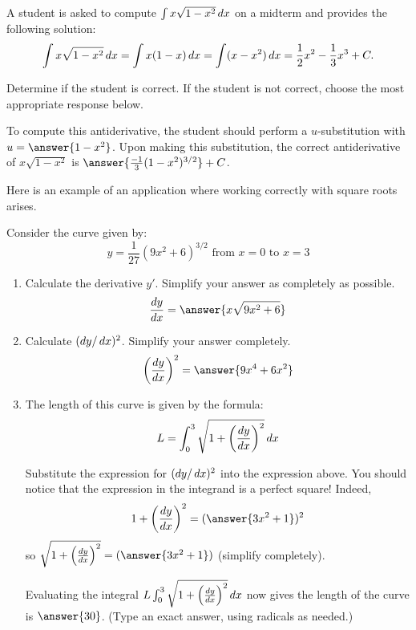 \documentclass{ximera}
\begin{document}
\begin{problem}
   A student is asked to compute $\int x \sqrt{1 - x^2} \mathop{}\!d x$ on a midterm and provides the following solution:
   \[
     \int x \sqrt{1 - x^2} \mathop{}\!d x = \int x(1 - x) \mathop{}\!d x = \int (x - x^2) \mathop{}\!d x = \frac{1}{2}x^2 - \frac{1}{3} x^3 + C.
   \]
   
   Determine if the student is correct.
   If the student is not correct, choose the most appropriate response below.
   \begin{multipleChoice}
   \end{multipleChoice}
   \begin{problem}
     To compute this antiderivative, the student should perform a
     $u$-substitution with $u = \answer{1 - x^2}$.  Upon making this
     substitution, the correct antiderivative of $x \sqrt{1 - x^2}$ is
     $\answer{\frac{-1}{3} (1 - x^2)^{3/2}} + C$.
   \end{problem}
\end{problem}

\begin{problem}
  Here is an example of an application where working correctly with square roots​ arises.
  
  Consider the curve given​ by:
  \[
    y = \frac{1}{27} (9x^2 + 6)^{3/2} \text{ from $x = 0$ to $x = 3$}
  \]
  \begin{enumerate}
    \item Calculate the derivative $y'$.
      Simplify your answer as completely as possible.
      \[
        \frac{\d y}{\d x} = \answer{x \sqrt{9x^2 + 6}}
      \]
    
    \item Calculate $(\mathop{}\!d y/ \mathop{}\!d x)^2$.
      Simplify your answer completely.
      \[
        \left( \frac{\d y}{\d x} \right)^2 = \answer{9x^4 + 6x^2}
      \]
      
    \item The length of this curve is given by the formula:
    \[
      L = \int_0^3 \sqrt{1 + \left( \frac{\mathop{}\!d y}{\mathop{}\!d x} \right)^2} \mathop{}\!d x
    \]
    
    Substitute the expression for $(\mathop{}\!d y/ \mathop{}\!d x)^2$ into the expression above.
    You should notice that the expression in the integrand is a perfect square!
    Indeed,
    \[
      1 + \left( \frac{\d y}{\d x} \right)^2 = (\answer{3x^2 + 1})^2
    \]
    so
    $\sqrt{1 + \left( \frac{\d y}{\d x} \right)^2} = (\answer{3x^2 + 1})$ (simplify completely).
    
    Evaluating the integral $L \int_0^3 \sqrt{1 + \left( \frac{\mathop{}\!d y}{\mathop{}\!d x} \right)^2} \mathop{}\!d x$ now gives the length of the curve is $\answer{30}$.
    (Type an exact answer, using radicals as needed.)
  \end{enumerate}
\end{problem}
\end{document}
